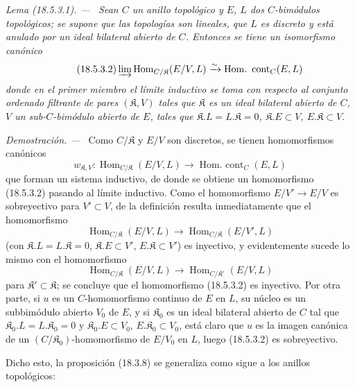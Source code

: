 \documentclass[10pt,oneside]{book}
\makeatletter
\newcommand{\setmanualcurrentlabel}[1]{\def\@currentlabel{#1}}
\newenvironment{lemma}[1][]{%
  \setmanualcurrentlabel{#1}\par\medskip\noindent\itshape Lema (#1). ---\ }{\par}
\newenvironment{proof}{%
  \par\medskip\noindent\textit{Demostración. ---\ }}{\par}
\makeatother
\begin{document}
\begin{lemma}[18.5.3.1]
\label{0.18.5.3.1-es}
Sean $C$ un anillo topológico y $E$, $L$ dos $C$-bimódulos topológicos;
se supone que las topologías son lineales, que $L$ es discreto y está anulado
por un ideal bilateral abierto de $C$. Entonces se tiene un isomorfismo canónico
\begin{equation}
\label{0.18.5.3.2-es}
\tag{18.5.3.2}
  \varinjlim\operatorname{Hom}_{C/\mathfrak K}(E/V,L)
  \xrightarrow{\sim}\operatorname{Hom.\ cont}_C(E,L)
\end{equation}
donde en el primer miembro el límite inductivo se toma con respecto al conjunto
ordenado filtrante de pares $(\mathfrak K,V)$ tales que $\mathfrak K$ es un
ideal bilateral abierto de $C$, $V$ un sub-$C$-bimódulo abierto de $E$, tales que
$\mathfrak K.L=L.\mathfrak K=0$, $\mathfrak K.E\subset V$,
$E.\mathfrak K\subset V$.
\end{lemma}

\begin{proof}
Como $C/\mathfrak K$ y $E/V$ son discretos, se tienen homomorfismos
canónicos
\[
  w_{\mathfrak K,V}:\operatorname{Hom}_{C/\mathfrak K}(E/V,L)
  \longrightarrow\operatorname{Hom.\ cont}_C(E,L)
\]
que forman un sistema inductivo, de donde se obtiene un homomorfismo (18.5.3.2) pasando al
límite inductivo. Como el homomorfismo $E/V'\to E/V$ es sobreyectivo para
$V'\subset V$, de la definición resulta inmediatamente que el homomorfismo
\[
  \operatorname{Hom}_{C/\mathfrak K}(E/V,L)
  \longrightarrow\operatorname{Hom}_{C/\mathfrak K}(E/V',L)
\]
(con $\mathfrak K.L=L.\mathfrak K=0$, $\mathfrak K.E\subset V'$,
$E.\mathfrak K\subset V'$) es inyectivo, y evidentemente sucede lo mismo con
el homomorfismo
\[
  \operatorname{Hom}_{C/\mathfrak K}(E/V,L)
  \longrightarrow\operatorname{Hom}_{C/\mathfrak K'}(E/V,L)
\]
para $\mathfrak K'\subset\mathfrak K$; se concluye que el homomorfismo
(18.5.3.2) es inyectivo. Por otra parte, si $u$ es un $C$-homomorfismo continuo
de $E$ en $L$, su núcleo es un subbimódulo abierto $V_0$ de $E$, y si
$\mathfrak K_0$ es un ideal bilateral abierto de $C$ tal que
$\mathfrak K_0.L=L.\mathfrak K_0=0$ y $\mathfrak K_0.E\subset V_0$,
$E.\mathfrak K_0\subset V_0$, está claro que $u$ es la imagen canónica de un
$(C/\mathfrak K_0)$-homomorfismo de $E/V_0$ en $L$, luego (18.5.3.2) es
sobreyectivo.
\end{proof}

Dicho esto, la proposición (18.3.8) se generaliza como sigue a los anillos
topológicos:
\end{document}
